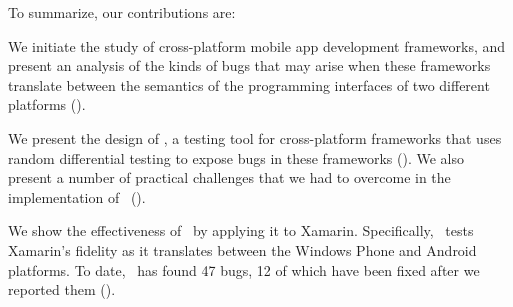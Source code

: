 
To summarize, our contributions are:
\begin{mybullet}

\item We initiate the study of cross-platform mobile app development
frameworks, and present an analysis of the kinds of bugs that may arise when
these frameworks translate between the semantics of the programming interfaces
of two different platforms ().

\item We present the design of \tool, a testing tool for cross-platform
frameworks that uses random differential testing to expose bugs in these
frameworks (). We also present a number of practical
challenges that we had to overcome in the implementation of \tool\
().

\item We show the effectiveness of \tool\ by applying it to Xamarin.
Specifically, \tool\ tests Xamarin's fidelity as it translates between the
Windows Phone and Android platforms. To date, \tool\ has found 47 bugs, 12 of
which have been fixed after we reported them (\sectref{section:evaluation}).

\end{mybullet}
